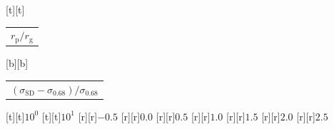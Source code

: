 %    
%
%
\begin{psfrags}%
\psfragscanon%
%
[t][t]{\color[rgb]{0,0,0}\setlength{\tabcolsep}{0pt}\begin{tabular}{c}{\Large$r_\mathrm{p}/r_\mathrm{g}$}\end{tabular}}%
[b][b]{\color[rgb]{0,0,0}\setlength{\tabcolsep}{0pt}\begin{tabular}{c}{\Large$(\sigma_\mathrm{SD}-\sigma_{0.68})/\sigma_{0.68}$}\end{tabular}}%
%
[t][t]{$10^{0}$}%
[t][t]{$10^{1}$}%
%
[r][r]{$-0.5$}%
[r][r]{$0.0$}%
[r][r]{$0.5$}%
[r][r]{$1.0$}%
[r][r]{$1.5$}%
[r][r]{$2.0$}%
[r][r]{$2.5$}%
%
%
\end{psfrags}%
%
